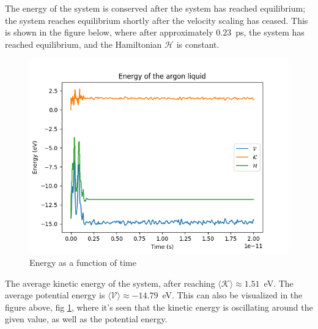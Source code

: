 \documentclass[a4paper]{article}
\newcommand{\newparagraph}{\vspace{.5cm}\noindent}
\newcommand{\average}[1]{\langle #1 \rangle}
\begin{document}
\newparagraph
The energy of the system is conserved after the system has reached equilibrium; the system reaches equilibrium shortly after the velocity scaling has ceased.
This is shown in the figure below, where after approximately $0.23$~ps, the system has reached equilibrium, and the Hamiltonian $\mathcal{H}$ is constant.
\begin{figure}[H]
    \centering
    \includegraphics[scale = .5]{energylattice.png}
    \caption{Energy as a function of time}
    \label{fig: energy}
\end{figure}\noindent
The average kinetic energy of the system, after reaching $\average{\mathcal{K}} \approx 1.51$~eV. The average potential energy is $\average{\mathcal{V}} \approx -14.79$~eV.
This can also be visualized in the figure above, fig \ref{fig: energy}, where it's seen that the kinetic energy is oscillating around the given value, as well as the potential energy.
\end{document}
